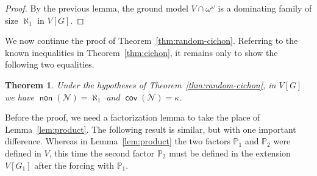 \documentclass[11pt,oneside,a4paper]{amsbook}
\newcommand{\PP}{\mathbb P}
\newcommand{\Null}{\mathcal N}
\DeclareMathOperator{\non}{\mathsf{non}}
\DeclareMathOperator{\cov}{\mathsf{cov}}
\theoremstyle{definition}
\theoremstyle{plain}
\newtheorem{theorem}{Theorem}[section]
\newtheorem{lemma}[theorem]{Lemma}
\theoremstyle{definition}
\theoremstyle{remark}
\numberwithin{equation}{section}
\numberwithin{figure}{section}
\begin{document}
\begin{proof}
  By the previous lemma, the ground model $V\cap\omega^\omega$ is a dominating family of size $\aleph_1$ in $V[G]$.
\end{proof}

We now continue the proof of Theorem~\ref{thm:random-cichon}. Referring to the known inequalities in Theorem~\ref{thm:cichon}, it remains only to show the following two equalities.

\begin{theorem}
  \label{thm:random-null}
  Under the hypotheses of Theorem~\ref{thm:random-cichon}, in $V[G]$ we have $\non(\Null)=\aleph_1$ and $\cov(\Null)=\kappa$.
\end{theorem}





Before the proof, we need a factorization lemma to take the place of Lemma~\ref{lem:product}. The following result is similar, but with one important difference. Whereas in Lemma~\ref{lem:product} the two factors $\PP_1$ and $\PP_2$ were defined in $V$, this time the second factor $\PP_2$ must be defined in the extension $V[G_1]$ after the forcing with $\PP_1$.
\end{document}
